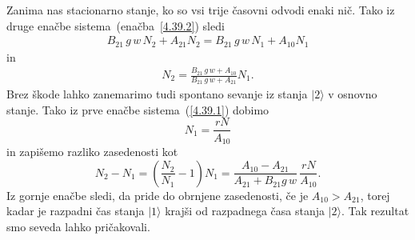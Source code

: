 Zanima nas stacionarno stanje, ko so vsi trije časovni odvodi enaki nič. 
Tako iz druge enačbe sistema~(enačba~\ref{4.39.2}) sledi
\begin{eqnarray}
B_{21}\,g\,w\, N_{2}+A_{21}N_{2} = B_{21}\,g\,w\, N_{1} + A_{10}N_{1} 
\end{eqnarray}
in
\begin{eqnarray}
N_2 = \frac{B_{21}\,g\,w + A_{10}}{B_{21}\,g\,w+A_{21}}N_1.  
\end{eqnarray}
Brez škode lahko zanemarimo tudi spontano sevanje iz stanja
$|2\rangle$ v osnovno stanje. Tako iz prve enačbe sistema~(\ref{4.39.1}) dobimo
\begin{equation}
N_1= \frac{rN}{A_{10}}
\end{equation}
in zapišemo razliko zasedenosti kot 
\begin{equation}
N_{2}-N_{1}=\left(\frac{N_2}{N_1}-1\right)N_1=\frac{A_{10}-A_{21}}{A_{21}+
B_{21}g\,w} \,\frac{rN}{A_{10}}.
\label{4.42}
\end{equation}
Iz gornje enačbe sledi, da pride do obrnjene 
zasedenosti, če je $A_{10}>A_{21}$, torej kadar je
razpadni čas stanja $|1\rangle$ krajši od razpadnega časa stanja $|2\rangle$.
Tak rezultat smo seveda lahko pričakovali.

